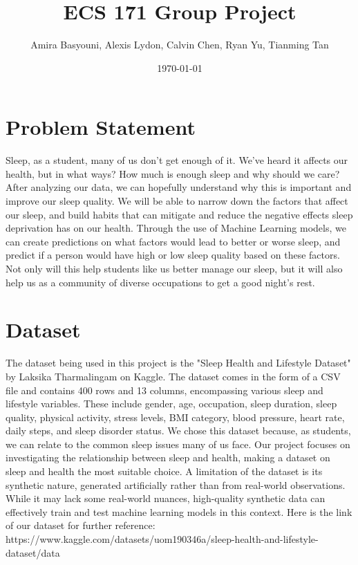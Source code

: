 \documentclass[11pt, letterpaper]{article}
\title{ECS 171 Group Project}
\author{Amira Basyouni, Alexis Lydon, Calvin Chen, Ryan Yu, Tianming Tan}
\date{\today}
\begin{document}
    \maketitle
    
    \newpage

    \section*{Problem Statement}
    Sleep, as a student, many of us don't get enough of it. We've heard it 
    affects our health, but in what ways? How much is enough sleep and why 
    should we care? After analyzing our data, we can hopefully understand 
    why this is important and improve our sleep quality. We will be able to 
    narrow down the factors that affect our sleep, and build habits that can 
    mitigate and reduce the negative effects sleep deprivation has on our 
    health. Through the use of Machine Learning models, we can create 
    predictions on what factors would lead to better or worse sleep, 
    and predict if a person would have high or low sleep quality based 
    on these factors. Not only will this help students like us 
    better manage our sleep, but it will also help us as a community of 
    diverse occupations to get a good night's rest.

    \section*{Dataset}
    The dataset being used in this project is the "Sleep Health and Lifestyle Dataset" by Laksika Tharmalingam on Kaggle. 
    The dataset comes in the form of a CSV file and contains 400 rows and 13 columns, encompassing various sleep and lifestyle variables. 
    These include gender, age, occupation, sleep duration, sleep quality, physical activity, stress levels, BMI category, blood pressure, heart rate, daily steps, 
    and sleep disorder status. We chose this dataset because, as students, we can relate to the common sleep issues many of us face. Our project focuses on investigating 
    the relationship between sleep and health, making a dataset on sleep and health the most suitable choice. A limitation of the dataset is its synthetic nature, generated 
    artificially rather than from real-world observations. While it may lack some real-world nuances, high-quality synthetic data can effectively train and test machine learning 
    models in this context. Here is the link of our dataset for further reference: https://www.kaggle.com/datasets/uom190346a/sleep-health-and-lifestyle-dataset/data
\end{document}
